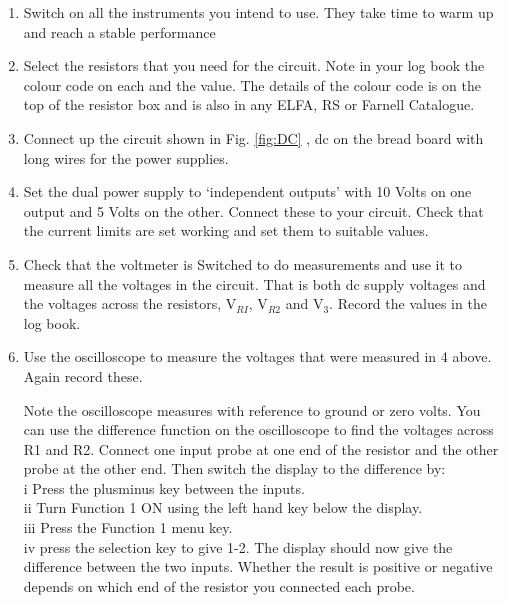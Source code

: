 \begin{enumerate}
  \item Switch on all the instruments you intend to use. They take time to warm up and reach a stable performance
  \item Select the resistors that you need for the circuit. Note in your log book the colour code on each and the value. The details of the colour code is on the top of the resistor box and is also in any ELFA, RS or Farnell Catalogue.
\item Connect up the circuit shown in Fig. \ref{fig:DC} , dc on the bread board with long wires for the power supplies.
\item Set the dual power supply to ‘independent outputs’ with 10 Volts on one output and 5 Volts on the other. Connect these to your circuit. Check that the current limits are set working and set them to suitable values.
\item Check that the voltmeter is Switched to do measurements and use it to measure all the
voltages in the circuit. That is both dc supply voltages and the voltages across the resistors,
V$_{RI}$, V$_{R2}$ and V$_3$. Record the values in the log book.
\item Use the oscilloscope to measure the voltages that were measured in 4 above. Again record
these. 

Note the oscilloscope measures with reference to ground or zero volts. You can use the
difference function on the oscilloscope to find the voltages across R1 and R2. Connect one
input probe at one end of the resistor and the other probe at the other end. Then switch the
display to the difference by: \\
i Press the plusminus key between the inputs. \\
ii Turn Function 1 ON using the left hand key below the display. \\
iii Press the Function 1 menu key. \\
iv press the selection key to give 1-2.
The display should now give the difference between the two inputs. Whether the result is
positive or negative depends on which end of the resistor you connected each probe.

\end{enumerate}






